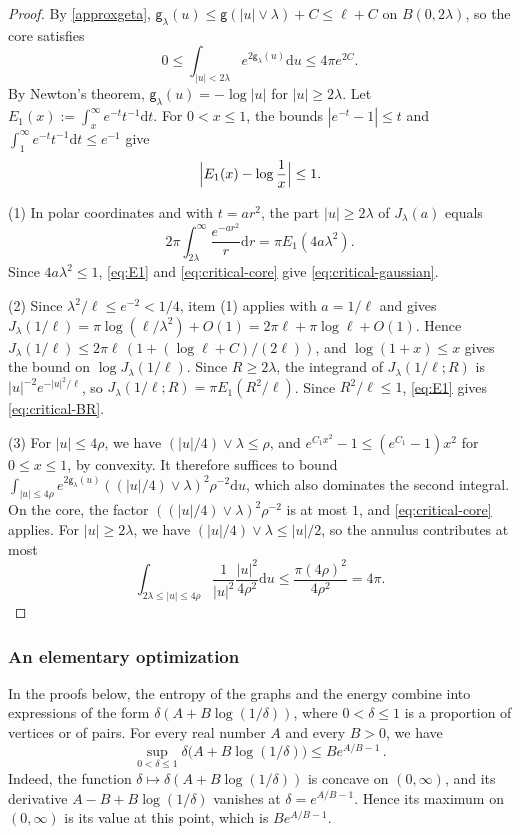\documentclass[a4paper,10pt,leqno]{amsart}
\numberwithin{equation}{section}
\newcommand{\dd}{\mathrm{d}}
\def\g{\mathsf{g}}
\begin{document}
\begin{proof}
  By \eqref{approxgeta}, $\g_\lambda(u)\le\g(|u|\vee\lambda)+C\le\ell+C$ on $B(0,2\lambda)$, so the core satisfies
  \begin{equation}\label{eq:critical-core}
    0\le\int_{|u|<2\lambda}e^{2\g_\lambda(u)}\dd u\le4\pi e^{2C}.
  \end{equation}
  By Newton's theorem, $\g_\lambda(u)=-\log|u|$ for $|u|\ge2\lambda$. Let $E_1(x):=\int_x^\infty e^{-t}t^{-1}\dd t$. For $0<x\le1$, the bounds $|e^{-t}-1|\le t$ and $\int_1^\infty e^{-t}t^{-1}\dd t\le e^{-1}$ give
  \begin{equation}\label{eq:E1}
    \Bigl|E_1(x)-\log\frac1x\Bigr|\le1.
  \end{equation}

  (1) In polar coordinates and with $t=ar^2$, the part $|u|\ge2\lambda$ of $J_\lambda(a)$ equals
  \[
    2\pi\int_{2\lambda}^\infty\frac{e^{-ar^2}}{r}\dd r=\pi E_1(4a\lambda^2).
  \]
  Since $4a\lambda^2\le1$, \eqref{eq:E1} and \eqref{eq:critical-core} give \eqref{eq:critical-gaussian}.

  (2) Since $\lambda^2/\ell\le e^{-2}<1/4$, item (1) applies with $a=1/\ell$ and gives $J_\lambda(1/\ell)=\pi\log(\ell/\lambda^2)+O(1)=2\pi\ell+\pi\log\ell+O(1)$. Hence $J_\lambda(1/\ell)\le2\pi\ell\,(1+(\log\ell+C)/(2\ell))$, and $\log(1+x)\le x$ gives the bound on $\log J_\lambda(1/\ell)$. Since $R\ge2\lambda$, the integrand of $J_\lambda(1/\ell;R)$ is $|u|^{-2}e^{-|u|^2/\ell}$, so $J_\lambda(1/\ell;R)=\pi E_1(R^2/\ell)$. Since $R^2/\ell\le1$, \eqref{eq:E1} gives \eqref{eq:critical-BR}.

  (3) For $|u|\le4\rho$, we have $(|u|/4)\vee\lambda\le\rho$, and $e^{C_1x^2}-1\le(e^{C_1}-1)x^2$ for $0\le x\le1$, by convexity. It therefore suffices to bound $\int_{|u|\le4\rho}e^{2\g_\lambda(u)}((|u|/4)\vee\lambda)^2\rho^{-2}\dd u$, which also dominates the second integral. On the core, the factor $((|u|/4)\vee\lambda)^2\rho^{-2}$ is at most $1$, and \eqref{eq:critical-core} applies. For $|u|\ge2\lambda$, we have $(|u|/4)\vee\lambda\le|u|/2$, so the annulus contributes at most
  \[
    \int_{2\lambda\le|u|\le4\rho}\frac1{|u|^2}\frac{|u|^2}{4\rho^2}\dd u\le\frac{\pi(4\rho)^2}{4\rho^2}=4\pi.
  \]
\end{proof}

\subsubsection*{An elementary optimization}
In the proofs below, the entropy of the graphs and the energy combine into expressions of the form $\delta(A+B\log(1/\delta))$, where $0<\delta\le1$ is a proportion of vertices or of pairs. For every real number $A$ and every $B>0$, we have
\begin{equation}\label{eq:sup-inequality}
  \sup_{0<\delta\le1}\delta\bigl(A+B\log(1/\delta)\bigr)\le Be^{A/B-1}\,.
\end{equation}
Indeed, the function $\delta\mapsto\delta(A+B\log(1/\delta))$ is concave on $(0,\infty)$, and its derivative $A-B+B\log(1/\delta)$ vanishes at $\delta=e^{A/B-1}$. Hence its maximum on $(0,\infty)$ is its value at this point, which is $Be^{A/B-1}$.
\end{document}
